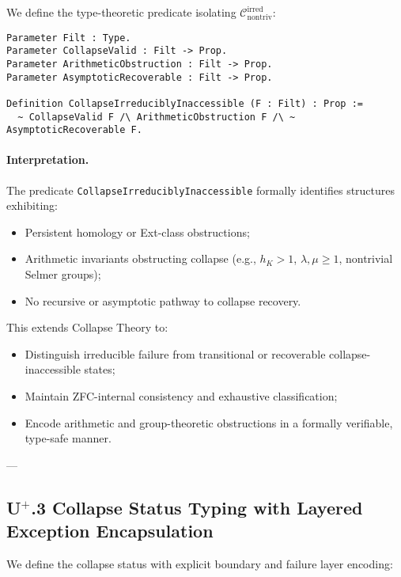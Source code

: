 \documentclass[11pt]{article}
\begin{document}
We define the type-theoretic predicate isolating $\mathcal{C}_{\mathrm{nontriv}}^{\mathrm{irred}}$:

\begin{lstlisting}[language=Coq]
Parameter Filt : Type.
Parameter CollapseValid : Filt -> Prop.
Parameter ArithmeticObstruction : Filt -> Prop.
Parameter AsymptoticRecoverable : Filt -> Prop.

Definition CollapseIrreduciblyInaccessible (F : Filt) : Prop :=
  ~ CollapseValid F /\ ArithmeticObstruction F /\ ~ AsymptoticRecoverable F.
\end{lstlisting}

\paragraph{Interpretation.}

The predicate \texttt{CollapseIrreduciblyInaccessible} formally identifies structures exhibiting:

\begin{itemize}
    \item Persistent homology or Ext-class obstructions;
    \item Arithmetic invariants obstructing collapse (e.g., $h_K > 1$, $\lambda, \mu \geq 1$, nontrivial Selmer groups);
    \item No recursive or asymptotic pathway to collapse recovery.
\end{itemize}

This extends Collapse Theory to:

\begin{itemize}
    \item Distinguish irreducible failure from transitional or recoverable collapse-inaccessible states;
    \item Maintain ZFC-internal consistency and exhaustive classification;
    \item Encode arithmetic and group-theoretic obstructions in a formally verifiable, type-safe manner.
\end{itemize}

---

\subsection*{U$^{+}$.3 Collapse Status Typing with Layered Exception Encapsulation}

We define the collapse status with explicit boundary and failure layer encoding:
\end{document}
